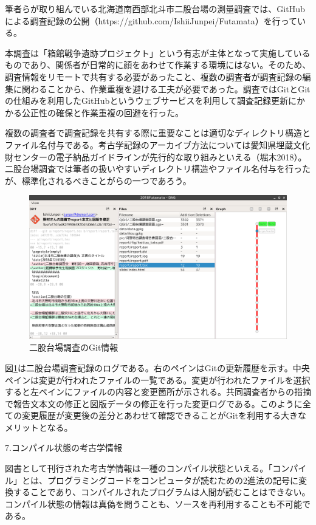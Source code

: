 \documentclass[9pt,b5j,papersize]{jsarticle}
\begin{document}
\begin{multicols}{2}
筆者らが取り組んでいる北海道南西部北斗市二股台場の測量調査では、GitHubによる調査記録の公開（https://github.com/IshiiJunpei/Futamata）を行っている。

本調査は「箱館戦争遺跡プロジェクト」という有志が主体となって実施しているものであり、関係者が日常的に顔をあわせて作業する環境にはない。そのため、調査情報をリモートで共有する必要があったこと、複数の調査者が調査記録の編集に関わることから、作業重複を避ける工夫が必要であった。調査ではGitとGitの仕組みを利用したGitHubというウェブサービスを利用して調査記録更新にかかる公正性の確保と作業重複の回避を行った。

複数の調査者で調査記録を共有する際に重要なことは適切なディレクトリ構造とファイル名付与である。考古学記録のアーカイブ方法については愛知県埋蔵文化財センターの電子納品ガイドラインが先行的な取り組みといえる（堀木2018）。二股台場調査では筆者の扱いやすいディレクトリ構造やファイル名付与を行ったが、標準化されるべきことがらの一つであろう。

\begin{figure}[H]
\centering
\includegraphics[width=1\linewidth]{01.png}
\caption{二股台場調査のGit情報}
\label{hutamata}
\end{figure}

図\ref{hutamata}は二股台場調査記録のログである。右のペインはGitの更新履歴を示す。中央ペインは変更が行われたファイルの一覧である。変更が行われたファイルを選択すると左ペインにファイルの内容と変更箇所が示される。共同調査者からの指摘で報告文本文の修正と図版データの修正を行った変更ログである。このように全ての変更履歴が変更後の差分とあわせて確認できることがGitを利用する大きなメリットとなる。


\noindent
{\large 7.コンパイル状態の考古学情報}

図書として刊行された考古学情報は一種のコンパイル状態といえる。「コンパイル」とは、プログラミングコードをコンピュータが読むための2進法の記号に変換することであり、コンパイルされたプログラムは人間が読むことはできない。コンパイル状態の情報は真偽を問うことも、ソースを再利用することも不可能である。


\end{multicols}
\end{document}

